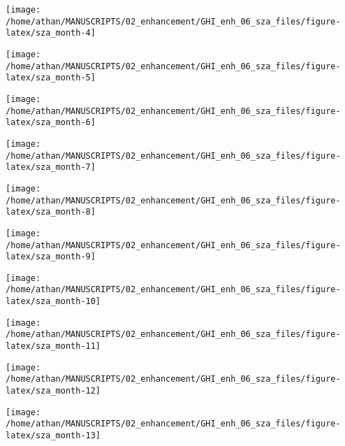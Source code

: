 \documentclass[
  10pt,
  a4paper,oneside]{article}
\begin{document}
\begin{center}\texttt{[image: /home/athan/MANUSCRIPTS/02\_enhancement/GHI\_enh\_06\_sza\_files/figure-latex/sza\_month-4]} \end{center}

\begin{center}\texttt{[image: /home/athan/MANUSCRIPTS/02\_enhancement/GHI\_enh\_06\_sza\_files/figure-latex/sza\_month-5]} \end{center}

\begin{center}\texttt{[image: /home/athan/MANUSCRIPTS/02\_enhancement/GHI\_enh\_06\_sza\_files/figure-latex/sza\_month-6]} \end{center}

\begin{center}\texttt{[image: /home/athan/MANUSCRIPTS/02\_enhancement/GHI\_enh\_06\_sza\_files/figure-latex/sza\_month-7]} \end{center}

\begin{center}\texttt{[image: /home/athan/MANUSCRIPTS/02\_enhancement/GHI\_enh\_06\_sza\_files/figure-latex/sza\_month-8]} \end{center}

\begin{center}\texttt{[image: /home/athan/MANUSCRIPTS/02\_enhancement/GHI\_enh\_06\_sza\_files/figure-latex/sza\_month-9]} \end{center}

\begin{center}\texttt{[image: /home/athan/MANUSCRIPTS/02\_enhancement/GHI\_enh\_06\_sza\_files/figure-latex/sza\_month-10]} \end{center}

\begin{center}\texttt{[image: /home/athan/MANUSCRIPTS/02\_enhancement/GHI\_enh\_06\_sza\_files/figure-latex/sza\_month-11]} \end{center}

\begin{center}\texttt{[image: /home/athan/MANUSCRIPTS/02\_enhancement/GHI\_enh\_06\_sza\_files/figure-latex/sza\_month-12]} \end{center}

\begin{center}\texttt{[image: /home/athan/MANUSCRIPTS/02\_enhancement/GHI\_enh\_06\_sza\_files/figure-latex/sza\_month-13]} \end{center}
\end{document}
